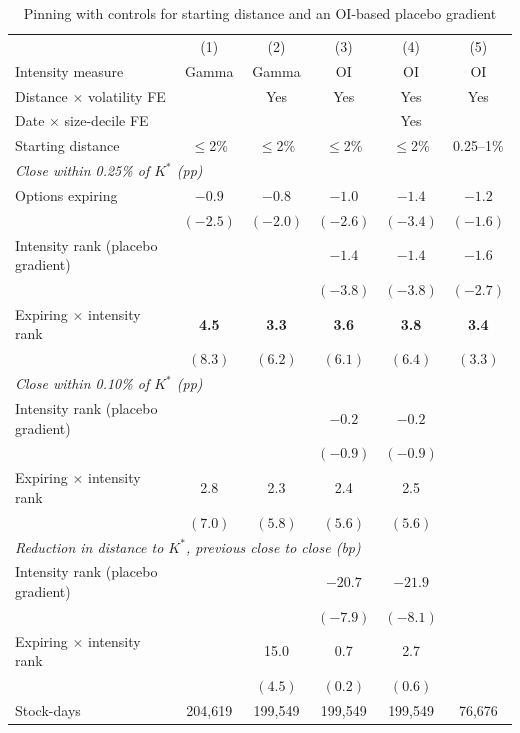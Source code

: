 \documentclass[11pt,a4paper]{article}
\newcommand{\Kstar}{K^{*}}
\begin{document}
\begin{table}[ht]
\centering
\begin{threeparttable}
\caption{Pinning with controls for starting distance and an OI-based placebo gradient}
\label{tab:pinrob}
\footnotesize
\setlength{\tabcolsep}{4pt}
\begin{tabular}{lccccc}
\toprule
 & (1) & (2) & (3) & (4) & (5) \\
Intensity measure & Gamma & Gamma & OI & OI & OI \\
Distance $\times$ volatility FE & & Yes & Yes & Yes & Yes \\
Date $\times$ size-decile FE & & & & Yes & \\
Starting distance & $\le$2\% & $\le$2\% & $\le$2\% & $\le$2\% & 0.25--1\% \\
\midrule
\multicolumn{6}{l}{\emph{Close within 0.25\% of $\Kstar$ (pp)}} \\
Options expiring & $-0.9$ & $-0.8$ & $-1.0$ & $-1.4$ & $-1.2$ \\
 & $(-2.5)$ & $(-2.0)$ & $(-2.6)$ & $(-3.4)$ & $(-1.6)$ \\
Intensity rank (placebo gradient) & & & $-1.4$ & $-1.4$ & $-1.6$ \\
 & & & $(-3.8)$ & $(-3.8)$ & $(-2.7)$ \\
Expiring $\times$ intensity rank & \textbf{4.5} & \textbf{3.3} & \textbf{3.6} & \textbf{3.8} & \textbf{3.4} \\
 & $(8.3)$ & $(6.2)$ & $(6.1)$ & $(6.4)$ & $(3.3)$ \\
\midrule
\multicolumn{6}{l}{\emph{Close within 0.10\% of $\Kstar$ (pp)}} \\
Intensity rank (placebo gradient) & & & $-0.2$ & $-0.2$ & \\
 & & & $(-0.9)$ & $(-0.9)$ & \\
Expiring $\times$ intensity rank & 2.8 & 2.3 & 2.4 & 2.5 & \\
 & $(7.0)$ & $(5.8)$ & $(5.6)$ & $(5.6)$ & \\
\midrule
\multicolumn{6}{l}{\emph{Reduction in distance to $\Kstar$, previous close to close (bp)}} \\
Intensity rank (placebo gradient) & & & $-20.7$ & $-21.9$ & \\
 & & & $(-7.9)$ & $(-8.1)$ & \\
Expiring $\times$ intensity rank & & 15.0 & 0.7 & 2.7 & \\
 & & $(4.5)$ & $(0.2)$ & $(0.6)$ & \\
\midrule
Stock-days & 204,619 & 199,549 & 199,549 & 199,549 & 76,676 \\

\end{tabular}
\end{threeparttable}
\end{table}
\end{document}
